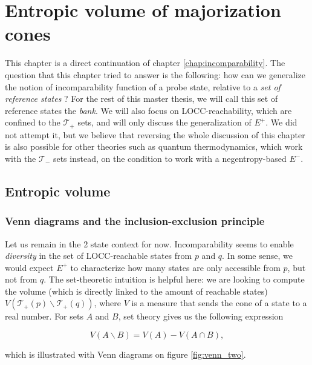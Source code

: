 \chapter{Entropic volume of majorization cones} \label{chap:volume}

This chapter is a direct continuation of chapter \ref{chap:incomparability}. The question that this chapter tried to answer is the following: how can we generalize the notion of incomparability function of a probe state, relative to a \textit{set of reference states} ? For the rest of this master thesis, we will call this set of reference states the \textit{bank}. We will also focus on LOCC-reachability, which are confined to the $\mathcal{T}_+$ sets, and will only discuss the generalization of $E^+$. We did not attempt it, but we believe that reversing the whole discussion of this chapter is also possible for other theories such as quantum thermodynamics, which work with the $\mathcal{T}_-$ sets instead, on the condition to work with a negentropy-based $E^-$.



\section{Entropic volume}

\subsection{Venn diagrams and the inclusion-exclusion principle}

Let us remain in the 2 state context for now. Incomparability seems to enable \textit{diversity} in the set of LOCC-reachable states from $p$ and $q$. In some sense, we would expect $E^+$ to characterize how many states are only accessible from $p$, but not from $q$. The set-theoretic intuition is helpful here: we are looking to compute the volume (which is directly linked to the amount of reachable states) $V(\mathcal{T}_+(p) \backslash \mathcal{T}_+(q))$, where $V$ is a measure that sends the cone of a state to a real number. For sets $A$ and $B$, set theory gives us the following expression

\begin{equation} \label{eq:2_set_exclusion}
    V(A \backslash B) = V(A) - V(A \cap B),
\end{equation}

\noindent which is illustrated with Venn diagrams on figure \ref{fig:venn_two}.

